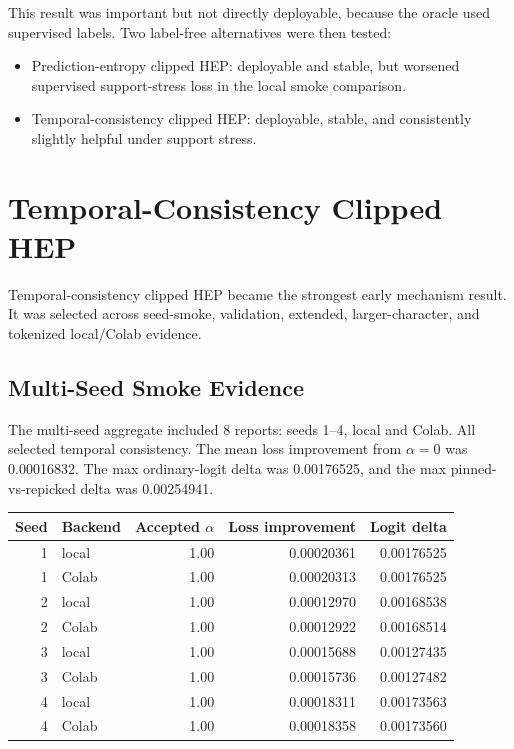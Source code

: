 \documentclass[11pt]{article}
\begin{document}
This result was important but not directly deployable, because the oracle used
supervised labels. Two label-free alternatives were then tested:

\begin{itemize}
  \item Prediction-entropy clipped HEP: deployable and stable, but worsened
  supervised support-stress loss in the local smoke comparison.
  \item Temporal-consistency clipped HEP: deployable, stable, and consistently
  slightly helpful under support stress.
\end{itemize}

\section{Temporal-Consistency Clipped HEP}

Temporal-consistency clipped HEP became the strongest early mechanism result.
It was selected across seed-smoke, validation, extended, larger-character, and
tokenized local/Colab evidence.

\subsection{Multi-Seed Smoke Evidence}

The multi-seed aggregate included 8 reports: seeds 1--4, local and Colab. All
selected temporal consistency. The mean loss improvement from $\alpha=0$ was
0.00016832. The max ordinary-logit delta was 0.00176525, and the max
pinned-vs-repicked delta was 0.00254941.

\begin{center}
\begin{tabular}{r l r r r}
\hline
Seed & Backend & Accepted $\alpha$ & Loss improvement & Logit delta \\
\hline
1 & local & 1.00 & 0.00020361 & 0.00176525 \\
1 & Colab & 1.00 & 0.00020313 & 0.00176525 \\
2 & local & 1.00 & 0.00012970 & 0.00168538 \\
2 & Colab & 1.00 & 0.00012922 & 0.00168514 \\
3 & local & 1.00 & 0.00015688 & 0.00127435 \\
3 & Colab & 1.00 & 0.00015736 & 0.00127482 \\
4 & local & 1.00 & 0.00018311 & 0.00173563 \\
4 & Colab & 1.00 & 0.00018358 & 0.00173560 \\
\hline
\end{tabular}
\end{center}
\end{document}
